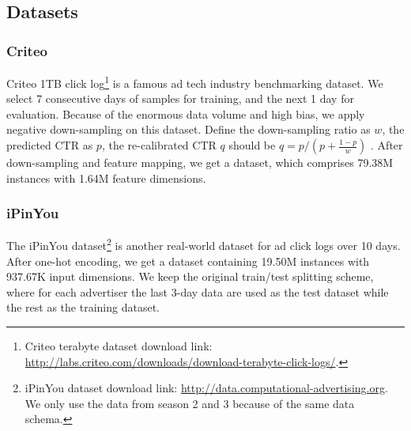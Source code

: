 \documentclass[conference]{IEEEtran}
\begin{document}
\subsection{Datasets}
\subsubsection{Criteo}
Criteo 1TB click log\footnote{Criteo terabyte dataset download link: \url{http://labs.criteo.com/downloads/download-terabyte-click-logs/}.} is a famous ad tech industry benchmarking dataset.
We select 7 consecutive days of samples for training, and the next 1 day for evaluation. Because of the enormous data volume and high bias, we apply negative down-sampling on this dataset.
Define the down-sampling ratio as $w$, the predicted CTR as $p$, the re-calibrated CTR $q$ should be $q =p / (p + \frac{1-p}{w})$ \cite{he2014practical}.
After down-sampling and feature mapping, we get a dataset, which comprises 79.38M instances with 1.64M feature dimensions.

\subsubsection{iPinYou}
The iPinYou dataset\footnote{iPinYou dataset download link: \url{http://data.computational-advertising.org}. We only use the data from season 2 and 3 because of the same data schema.} is another real-world dataset for ad click logs over 10 days.
After one-hot encoding, we get a dataset containing 19.50M instances with 937.67K input dimensions.
We keep the original train/test splitting scheme, where for each advertiser the last 3-day data are used as the test dataset while the rest as the training dataset.
\end{document}

